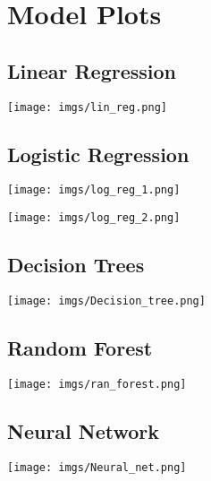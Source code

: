 \documentclass{article}[12pt]
\theoremstyle{definition}
\begin{document}
\appendix
\section{Model Plots}

\bigskip

\subsection{Linear Regression}

\begin{center}
    \texttt{[image: imgs/lin\_reg.png]}
\end{center}

\bigskip

\subsection{Logistic Regression}

\begin{center}
    \texttt{[image: imgs/log\_reg\_1.png]}
\end{center}

\newpage

\begin{center}
    \texttt{[image: imgs/log\_reg\_2.png]}
\end{center}

\bigskip

\subsection{Decision Trees}

\begin{center}
    \texttt{[image: imgs/Decision\_tree.png]}
\end{center}

\newpage

\subsection{Random Forest}

\begin{center}
    \texttt{[image: imgs/ran\_forest.png]}
\end{center}

\subsection{Neural Network}

\begin{center}
    \texttt{[image: imgs/Neural\_net.png]}
\end{center}

\newpage



\nocite{*}

\end{document}
